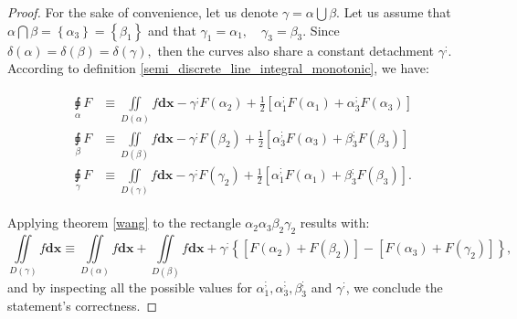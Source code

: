 \documentclass[11pt]{book}
\begin{document}
\begin{proof}For the sake of convenience, let us denote $\gamma=\alpha\bigcup\beta.$ Let us assume that $\alpha\bigcap\beta=\left\{\alpha_3\right\}=\left\{\beta_1\right\}$ and that $\gamma_1=\alpha_1,\quad\gamma_3=\beta_3.$ Since $\delta\left(\alpha\right)=\delta\left(\beta\right)=\delta\left(\gamma\right),$ then the curves also share a constant detachment $\gamma^;$. According to definition \ref{semi_discrete_line_integral_monotonic}, we have:

\begin{align}
&\begin{aligned}
\underset{\alpha}{\sqint}F & \equiv\underset{D\left(\alpha\right)}{\iint}f\boldsymbol{dx}-\gamma^{;}F\left(\alpha_{2}\right)+\frac{1}{2}\left[\alpha_{1}^{;}F\left(\alpha_{1}\right)+\alpha_{3}^{;}F\left(\alpha_{3}\right)\right]\\
\underset{\beta}{\sqint}F & \equiv\underset{D\left(\beta\right)}{\iint}f\boldsymbol{dx}-\gamma^{;}F\left(\beta_{2}\right)+\frac{1}{2}\left[\alpha_{3}^{;}F\left(\alpha_{3}\right)+\beta_{3}^{;}F\left(\beta_{3}\right)\right]\\
\underset{\gamma}{\sqint}F & \equiv\underset{D\left(\gamma\right)}{\iint}f\boldsymbol{dx}-\gamma^{;}F\left(\gamma_{2}\right)+\frac{1}{2}\left[\alpha_{1}^{;}F\left(\alpha_{1}\right)+\beta_{3}^{;}F\left(\beta_{3}\right)\right].
\end{aligned}
\end{align}

Applying theorem \ref{wang} to the rectangle $\alpha_2\alpha_3\beta_2\gamma_2$ results with:
$$\underset{D\left(\gamma\right)}{\iint}f\boldsymbol{dx}  \equiv\underset{D\left(\alpha\right)}{\iint}f\boldsymbol{dx}+\underset{D\left(\beta\right)}{\iint}f\boldsymbol{dx}+\gamma^{;}\left\{ \left[F\left(\alpha_{2}\right)+F\left(\beta_{2}\right)\right]-\left[F\left(\alpha_{3}\right)+F\left(\gamma_{2}\right)\right]\right\} ,$$
and by inspecting all the possible values for $\alpha_1^;,\alpha_3^;,\beta_3^;$ and $\gamma^;$, we conclude the statement's correctness.
\end{proof}
\end{document}

